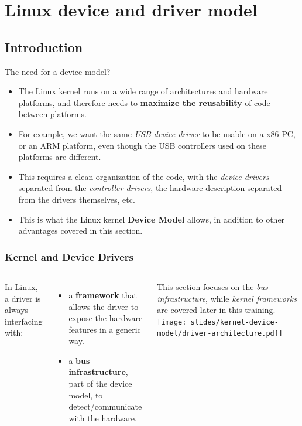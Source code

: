 \section{Linux device and driver model}

\subsection{Introduction}

\begin{frame}{The need for a device model?}
  \begin{itemize}
  \item The Linux kernel runs on a wide range of architectures and
    hardware platforms, and therefore needs to {\bf maximize the
      reusability} of code between platforms.
  \item For example, we want the same {\em USB device driver} to be
    usable on a x86 PC, or an ARM platform, even though the USB
    controllers used on these platforms are different.
  \item This requires a clean organization of the code, with the {\em
      device drivers} separated from the {\em controller drivers}, the
    hardware description separated from the drivers themselves, etc.
  \item This is what the Linux kernel {\bf Device Model} allows, in
    addition to other advantages covered in this section.
  \end{itemize}
\end{frame}

\begin{frame}
  \frametitle{Kernel and Device Drivers}
  \begin{columns}
     In Linux, a driver is always interfacing
    with:
    \begin{itemize}
    \item a {\bf framework} that allows the driver to expose the
      hardware features in a generic way.
    \item a {\bf bus infrastructure}, part of the device model, to
      detect/communicate with the hardware.
    \end{itemize}
    This section focuses on the {\em bus infrastructure}, while {\em kernel
      frameworks} are covered later in this training.
    \texttt{[image: slides/kernel-device-model/driver-architecture.pdf]}
  \end{columns}
\end{frame}

